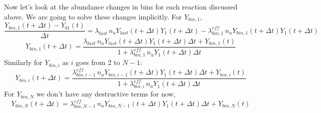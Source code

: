 \documentclass{article}
\begin{document}
Now let's look at the abundance changes in bins for each reaction discussed
above. We are going to solve these changes implicitly. For $Y_{bin,1}$,
\[
\frac {Y_{bin,1}(t+\Delta t) - Y_{b1}(t)} {\Delta t} =
  \lambda_{last} \, n_a Y_{last}(t+\Delta t) Y_1(t+\Delta t) -
  \lambda^{eff}_{bin,1} \, n_a Y_{bin,1}(t+\Delta t) Y_1(t+\Delta t)
\]
\[
Y_{bin,1}(t+\Delta t) = \frac
  {\lambda_{last} \, n_a Y_{last}(t+\Delta t) Y_1(t+\Delta t) \Delta t +
    Y_{bin,1}(t)}
  {1 + \lambda^{eff}_{bin,1} \, n_a Y_1(t+\Delta t) \Delta t}
\]
Similarly for $Y_{bin,i}$ as $i$ goes from 2 to $N-1$:
\[
Y_{bin,i}(t+\Delta t) = \frac
  {\lambda^{eff}_{bin,i-1} \, n_a Y_{bin,i-1}(t+\Delta t) Y_1(t+\Delta t) 
    \Delta t +
    Y_{bin,i}(t)}
  {1 + \lambda^{eff}_{bin,i} \, n_a Y_1(t+\Delta t) \Delta t}
\]
For $Y_{bin,N}$ we don't have any destructive terms for now,
\[
Y_{bin,N}(t+\Delta t) = 
  \lambda^{eff}_{bin,N-1} \, n_a Y_{bin,N-1}(t+\Delta t) Y_1(t+\Delta t) 
    \Delta t +
    Y_{bin,N}(t)
\]
\end{document}
